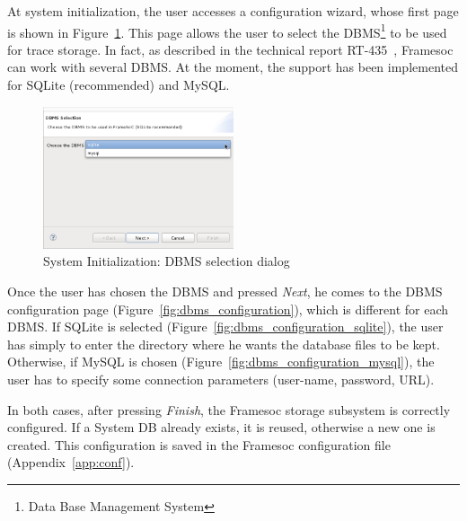\documentclass[twoside]{article}
\begin{document}
\begin{sloppypar}
At system initialization, the user accesses a configuration wizard, whose first page is shown in Figure~\ref{fig:dbms_selection}. 
This page allows the user to select the DBMS\footnote{Data Base Management System} to be used for trace storage.
In fact, as described in the technical report RT-435~\cite{pagano:hal-00830008}, Framesoc can work with several DBMS.
At the moment, the support has been implemented for SQLite (recommended) and MySQL.

\begin{figure}[h!]
  \centering
    \includegraphics[width=0.5\textwidth]{images/dbms_selection.png}
  \caption{System Initialization: DBMS selection dialog}
  \label{fig:dbms_selection}
\end{figure}

Once the user has chosen the DBMS and pressed \emph{Next}, he comes to the DBMS configuration page (Figure~\ref{fig:dbms_configuration}), which is different for each DBMS.
If SQLite is selected (Figure~\ref{fig:dbms_configuration_sqlite}), the user has simply to enter the directory where he wants the database files to be kept.
Otherwise, if MySQL is chosen (Figure~\ref{fig:dbms_configuration_mysql}), the user has to specify some connection parameters (user-name, password, URL).

In both cases, after pressing \emph{Finish}, the Framesoc storage subsystem is correctly configured. 
If a System DB already exists, it is reused, otherwise a new one is created.
This configuration is saved in the Framesoc configuration file (Appendix~\ref{app:conf}). %


\end{sloppypar}
\end{document}
